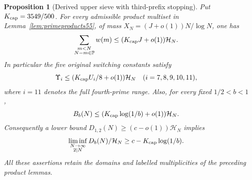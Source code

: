 \documentclass[11pt]{article}
\newtheorem{proposition}[theorem]{Proposition}
\newcommand{\PP}{\mathbb P}
\newcommand{\HN}{\mathcal H_N}
\begin{document}
\begin{proposition}[Derived upper sieve with third-prefix stopping]
\label{prop:pruned-upper}
Put $K_{\rm cap}=3549/500$. For every admissible product multiset
in Lemma~\ref{lem:primeproducts55}, of mass
$X_N=(J+o(1))N/\log N$, one has
\[
 \sum_{\substack{m<N\\N-m\in\PP}}w(m)
 \le (K_{\rm cap}J+o(1))\HN.
\]
In particular the five original switching constants satisfy
\begin{equation}\label{eq:pruned-switching}
 \Upsilon_i\le(K_{\rm cap}U_i/8+o(1))\HN
 \quad(i=7,8,9,10,11),
\end{equation}
where $i=11$ denotes the full fourth-prime range. Also, for every
fixed $1/2<b<1$,
\begin{equation}\label{eq:pruned-bad-semiprimes}
 B_b(N)\le(K_{\rm cap}\log(1/b)+o(1))\HN.
\end{equation}
Consequently a lower bound $D_{1,2}(N)\ge(c-o(1))\HN$ implies
\begin{equation}\label{eq:pruned-transfer}
 \liminf_{\substack{N\to\infty\\2\mid N}}D_b(N)/\HN
 \ge c-K_{\rm cap}\log(1/b).
\end{equation}
All these assertions retain the domains and labelled multiplicities
of the preceding product lemmas.
\end{proposition}
\end{document}

